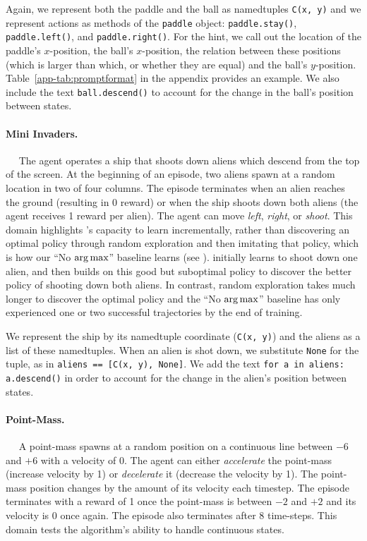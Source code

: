 \documentclass{article}
\newcommand\NoArgMax{``No $\argmax$''}
\begin{document}
Again, we represent both the paddle and the ball as namedtuples \texttt{C(x,
  y)} and we represent actions as methods of the \texttt{paddle} object:
\texttt{paddle.stay()}, \texttt{paddle.left()}, and \texttt{paddle.right()}.
For the hint, we call out the location of the paddle's $x$-position, the
ball's $x$-position, the relation between these positions (which is larger
than which, or whether they are equal) and the ball's $y$-position.
Table~\ref{app-tab:promptformat} in the appendix provides an example. We also include the text
\texttt{ball.descend()} to account for the change in the ball's position
between states. \paragraph{Mini Invaders.}~~ The agent operates a ship that
shoots down aliens which descend from the top of the screen. At the beginning
of an episode, two aliens spawn at a random location in two of four columns.
The episode terminates when  an alien reaches the ground (resulting in 0
reward) or when the ship shoots down both aliens (the agent receives 1 reward
per alien). The agent can move \emph{left}, \emph{right}, or \emph{shoot}.
This domain highlights \Algorithm{}'s capacity to learn incrementally, rather
than discovering an optimal policy through random exploration and then
imitating that policy, which is how our \NoArgMax{} baseline learns (see
). \Algorithm{} initially learns to shoot down one
alien, and then builds on this good but suboptimal policy to discover the
better policy of shooting down both aliens. In contrast, random exploration
takes much longer to discover the optimal policy and the \NoArgMax{} baseline
has only experienced one or two successful trajectories by the end of
training.

We represent the ship by its namedtuple coordinate (\texttt{C(x, y)}) and the
aliens as a list of these namedtuples. When an alien is shot down, we substitute
\texttt{None} for the tuple, as in \texttt{aliens == [C(x, y), None]}. We add
the text \texttt{for a in aliens: a.descend()} in order to account for the
change in the alien's position between states.

\paragraph{Point-Mass.}~~ A point-mass spawns at a random position on a
continuous line between $-6$ and $+6$ with a velocity of 0. The agent can either
\emph{accelerate} the point-mass (increase velocity by 1) or \emph{decelerate}
it (decrease the velocity by 1). The point-mass position changes by the amount
of its velocity each timestep. The episode terminates with a reward of 1
once the point-mass is between $-2$ and $+2$ and its velocity is 0 once again.
The episode also terminates after 8 time-steps. This domain tests the
algorithm's ability to handle continuous states.
\end{document}
